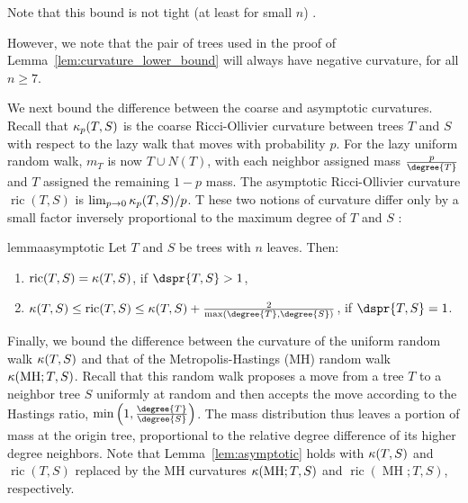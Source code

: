 \documentclass[11pt]{amsart}
\newcommand{\MH}{\operatorname{MH}}
\newcommand{\cuttable}[2][]{%
    \ifthenelse{\equal{#1}{}}%
		{}%
		{#1}%
}
\newcommand{\curvature}[2][]{%
    \ifthenelse{\equal{#1}{}}%
		{\kappa(#2)}%
		{\kappa_{#1}(#2)}%
}
\newcommand{\ric}[1]{
	\operatorname{ric}(#1)%
}
\begin{document}
Note that this bound is not tight (at least for small $n$)\cuttable{ as it is rarely necessary to transport mass the maximum distance between unpaired trees}.
\cuttable{We also note that the lower bounds in this section do not follow from the more general setting described in \cite{Jost2013-ce}.}
However, we note that the pair of trees used in the proof of Lemma~\ref{lem:curvature_lower_bound} will always have negative curvature, for all $n \ge 7$.

We next bound the difference between the coarse and asymptotic curvatures.
Recall that $\curvature[p]{T,S}$ is the coarse Ricci-Ollivier curvature between trees $T$ and $S$ with respect to the lazy walk that \cuttable{remains at a given tree with probability $1-p$ and }moves with probability $p$.
For the lazy uniform random walk, $m_T$ is now $T \cup N(T)$, with each neighbor assigned mass $\frac{p}{\degree{T}}$ and $T$ assigned the remaining $1 - p$ mass.
The asymptotic Ricci-Ollivier curvature $\ric{T,S}$ is $\lim_{p \rightarrow 0} \curvature[p]{T,S} / p$.
\cuttable[T]{As we now prove, t}hese two notions of curvature differ only by a small factor inversely proportional to the maximum degree of $T$ and $S$\cuttable[:]{.}

\begin{restatable}{lemma}{asymptotic}
\label{lem:asymptotic}
	Let $T$ and $S$ be trees with $n$ leaves.
	Then:
	\begin{enumerate}
		\item	$\ric{T,S} = \curvature{T,S}$, if $\dspr{T,S} > 1$,
		\item	$\curvature{T,S} \le \ric{T,S} \le \curvature{T,S} + \frac{2}{\max(\degree{T}, \degree{S})}$, if $\dspr{T,S} = 1$.
	\end{enumerate}
\end{restatable}


Finally, we bound the difference between the curvature of the uniform random walk $\curvature{T,S}$ and that of the Metropolis-Hastings (MH) random walk $\curvature{\MH; T,S}$.
Recall that this random walk proposes a move from a tree $T$ to a neighbor tree $S$ uniformly at random and then accepts the move according to the Hastings ratio, \cuttable{which in this case is }$\min\left(1, \frac{\degree{T}}{\degree{S}}\right)$.
The mass distribution \cuttable{for the MH random walk }thus leaves a portion of mass at the origin tree, proportional to the relative degree difference of its higher degree neighbors.
Note that \cuttable{the same statement and proof of }Lemma~\ref{lem:asymptotic} holds with $\curvature{T,S}$ and $\ric{T,S}$ replaced by the MH curvatures $\curvature{\MH; T,S}$ and $\ric{\MH; T,S}$, respectively.
\end{document}
